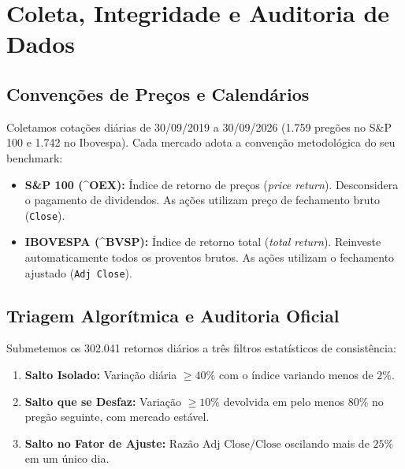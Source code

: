 \documentclass[11pt,a4paper]{article}
\begin{document}
\section{Coleta, Integridade e Auditoria de Dados}

\subsection{Convenções de Preços e Calendários}
Coletamos cotações diárias de 30/09/2019 a 30/09/2026 (1.759 pregões no S\&P 100 e 1.742 no Ibovespa). Cada mercado adota a convenção metodológica do seu benchmark:
\begin{itemize}
    \item \textbf{S\&P 100 (^OEX):} Índice de retorno de preços (\textit{price return}). Desconsidera o pagamento de dividendos. As ações utilizam preço de fechamento bruto (\texttt{Close}).
    \item \textbf{IBOVESPA (^BVSP):} Índice de retorno total (\textit{total return}). Reinveste automaticamente todos os proventos brutos. As ações utilizam o fechamento ajustado (\texttt{Adj Close}).
\end{itemize}

\subsection{Triagem Algorítmica e Auditoria Oficial}
Submetemos os 302.041 retornos diários a três filtros estatísticos de consistência:
\begin{enumerate}
    \item \textbf{Salto Isolado:} Variação diária $\ge 40\%$ com o índice variando menos de $2\%$.
    \item \textbf{Salto que se Desfaz:} Variação $\ge 10\%$ devolvida em pelo menos $80\%$ no pregão seguinte, com mercado estável.
    \item \textbf{Salto no Fator de Ajuste:} Razão $\text{Adj Close}/\text{Close}$ oscilando mais de $25\%$ em um único dia.
\end{enumerate}
\end{document}
